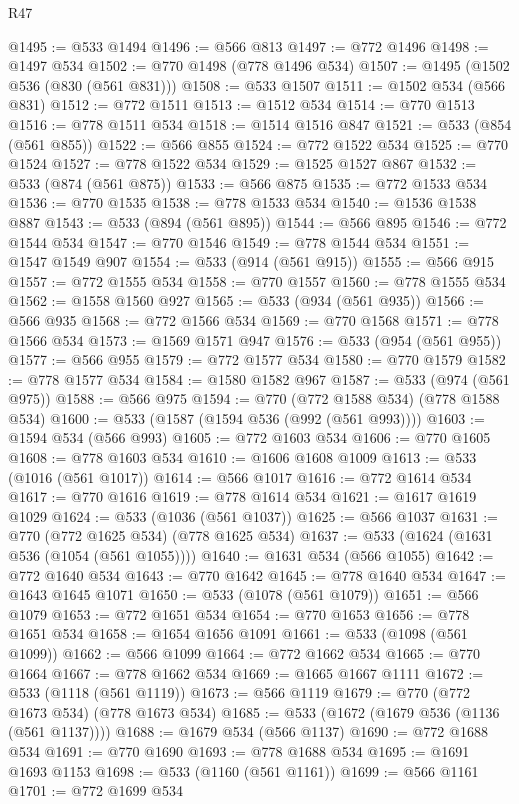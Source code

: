 \begin{lexlean}{R47}
\begin{coremodule}
@1495 := @533 @1494
@1496 := @566 @813
@1497 := @772 @1496
@1498 := @1497 @534
@1502 := @770 @1498 (@778 @1496 @534)
@1507 := @1495 (@1502 @536 (@830 (@561 @831)))
@1508 := @533 @1507
@1511 := @1502 @534 (@566 @831)
@1512 := @772 @1511
@1513 := @1512 @534
@1514 := @770 @1513
@1516 := @778 @1511 @534
@1518 := @1514 @1516 @847
@1521 := @533 (@854 (@561 @855))
@1522 := @566 @855
@1524 := @772 @1522 @534
@1525 := @770 @1524
@1527 := @778 @1522 @534
@1529 := @1525 @1527 @867
@1532 := @533 (@874 (@561 @875))
@1533 := @566 @875
@1535 := @772 @1533 @534
@1536 := @770 @1535
@1538 := @778 @1533 @534
@1540 := @1536 @1538 @887
@1543 := @533 (@894 (@561 @895))
@1544 := @566 @895
@1546 := @772 @1544 @534
@1547 := @770 @1546
@1549 := @778 @1544 @534
@1551 := @1547 @1549 @907
@1554 := @533 (@914 (@561 @915))
@1555 := @566 @915
@1557 := @772 @1555 @534
@1558 := @770 @1557
@1560 := @778 @1555 @534
@1562 := @1558 @1560 @927
@1565 := @533 (@934 (@561 @935))
@1566 := @566 @935
@1568 := @772 @1566 @534
@1569 := @770 @1568
@1571 := @778 @1566 @534
@1573 := @1569 @1571 @947
@1576 := @533 (@954 (@561 @955))
@1577 := @566 @955
@1579 := @772 @1577 @534
@1580 := @770 @1579
@1582 := @778 @1577 @534
@1584 := @1580 @1582 @967
@1587 := @533 (@974 (@561 @975))
@1588 := @566 @975
@1594 := @770 (@772 @1588 @534) (@778 @1588 @534)
@1600 := @533 (@1587 (@1594 @536 (@992 (@561 @993))))
@1603 := @1594 @534 (@566 @993)
@1605 := @772 @1603 @534
@1606 := @770 @1605
@1608 := @778 @1603 @534
@1610 := @1606 @1608 @1009
@1613 := @533 (@1016 (@561 @1017))
@1614 := @566 @1017
@1616 := @772 @1614 @534
@1617 := @770 @1616
@1619 := @778 @1614 @534
@1621 := @1617 @1619 @1029
@1624 := @533 (@1036 (@561 @1037))
@1625 := @566 @1037
@1631 := @770 (@772 @1625 @534) (@778 @1625 @534)
@1637 := @533 (@1624 (@1631 @536 (@1054 (@561 @1055))))
@1640 := @1631 @534 (@566 @1055)
@1642 := @772 @1640 @534
@1643 := @770 @1642
@1645 := @778 @1640 @534
@1647 := @1643 @1645 @1071
@1650 := @533 (@1078 (@561 @1079))
@1651 := @566 @1079
@1653 := @772 @1651 @534
@1654 := @770 @1653
@1656 := @778 @1651 @534
@1658 := @1654 @1656 @1091
@1661 := @533 (@1098 (@561 @1099))
@1662 := @566 @1099
@1664 := @772 @1662 @534
@1665 := @770 @1664
@1667 := @778 @1662 @534
@1669 := @1665 @1667 @1111
@1672 := @533 (@1118 (@561 @1119))
@1673 := @566 @1119
@1679 := @770 (@772 @1673 @534) (@778 @1673 @534)
@1685 := @533 (@1672 (@1679 @536 (@1136 (@561 @1137))))
@1688 := @1679 @534 (@566 @1137)
@1690 := @772 @1688 @534
@1691 := @770 @1690
@1693 := @778 @1688 @534
@1695 := @1691 @1693 @1153
@1698 := @533 (@1160 (@561 @1161))
@1699 := @566 @1161
@1701 := @772 @1699 @534

\end{coremodule}
\end{lexlean}
